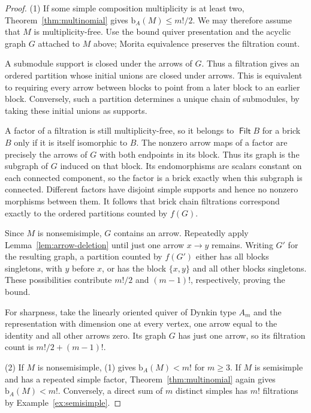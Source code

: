 \documentclass[a4paper,reqno,10pt]{amsart}
\theoremstyle{definition}
\numberwithin{equation}{section}
\DeclareMathOperator{\Filt}{\mathsf{Filt}}
\newcommand{\bcount}{\mathrm b}
\begin{document}
\begin{proof}
(1) If some simple composition multiplicity is at least two,
Theorem~\ref{thm:multinomial} gives $\bcount_A(M)\leq m!/2$.
We may therefore assume that $M$ is multiplicity-free.
Use the bound quiver presentation and the acyclic graph $G$ attached
to $M$ above; Morita equivalence preserves the filtration count.

A submodule support is closed under the arrows of $G$. Thus a
filtration gives an ordered partition whose initial unions are closed
under arrows. This is equivalent to requiring every arrow between
blocks to point from a later block to an earlier block. Conversely,
such a partition determines a unique chain of submodules, by taking
these initial unions as supports.

A factor of a filtration is still multiplicity-free, so it belongs to $\Filt B$ for
a brick $B$ only if it is itself isomorphic to $B$. The nonzero arrow
maps of a factor are precisely the arrows of $G$ with both endpoints
in its block. Thus its graph is the subgraph of $G$ induced on that
block. Its endomorphisms are scalars constant on each connected
component, so the factor is a brick exactly when this subgraph is
connected. Different factors have disjoint simple supports and hence
no nonzero morphisms between them. It follows that brick chain
filtrations correspond exactly to the ordered partitions counted by
$f(G)$.

Since $M$ is nonsemisimple, $G$ contains an arrow. Repeatedly apply
Lemma~\ref{lem:arrow-deletion} until just one arrow $x\to y$ remains.
Writing $G'$ for the resulting graph, a partition counted by $f(G')$
either has all blocks singletons, with $y$ before $x$, or has the block
$\{x,y\}$ and all
other blocks singletons. These possibilities contribute $m!/2$ and
$(m-1)!$, respectively, proving the bound.

For sharpness, take the linearly oriented quiver of Dynkin type $A_m$ and the
representation with dimension one at every vertex, one arrow equal to
the identity and all other arrows zero. Its graph $G$ has just one
arrow, so its filtration count is $m!/2+(m-1)!$.

(2) If $M$ is nonsemisimple, (1) gives $\bcount_A(M)<m!$ for $m\geq3$.
If $M$ is semisimple and has a repeated simple factor,
Theorem~\ref{thm:multinomial} again gives $\bcount_A(M)<m!$.
Conversely, a direct sum of $m$ distinct
simples has $m!$ filtrations by Example~\ref{ex:semisimple}.
\end{proof}
\end{document}
